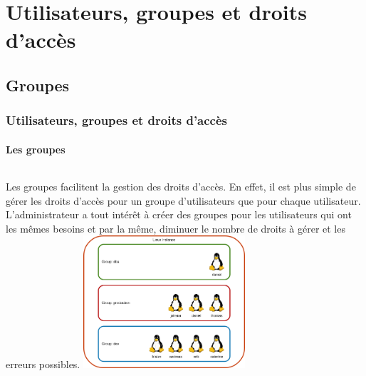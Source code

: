 \documentclass{beamer}
\begin{document}
    \section{Utilisateurs, groupes et droits d'accès}\label{sec:utilisateurs-groupes-droits}

    \subsection{Groupes}\label{subsec:groupes}

    \begin{frame}
        \transdissolve
        \frametitle{Utilisateurs, groupes et droits d'accès}
        \framesubtitle{Les groupes}
        \begin{columns}
            Les groupes facilitent la gestion des droits d'accès.
            En effet, il est plus simple de gérer les droits d'accès pour un groupe d'utilisateurs que pour chaque utilisateur.
            \bigbreak
            L'administrateur a tout intérêt à créer des groupes pour les utilisateurs qui ont les mêmes besoins et par la même, diminuer le nombre de droits à gérer et les erreurs possibles.
            \centering
            \includegraphics[width=6cm]{image/groups-and-users.drawio}
        \end{columns}
    \end{frame}
\end{document}
